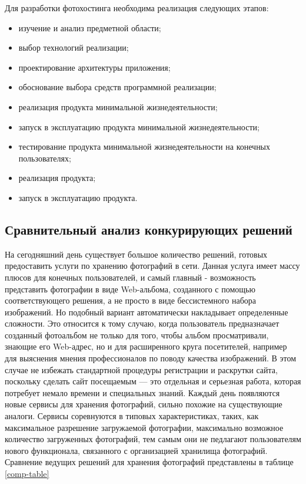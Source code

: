 Для разработки фотохостинга необходима реализация следующих этапов:
\begin{itemize}
    \item изучение и анализ предметной области;
    \item выбор технологий реализации;
    \item проектирование архитектуры приложения;
    \item обоснование выбора средств программной реализации;
    \item реализация продукта минимальной жизнедеятельности;
    \item запуск в эксплуатацию продукта минимальной жизнедеятельности;
    \item тестирование продукта минимальной жизнедеятельности на конечных пользователях;
    \item реализация продукта;
    \item запуск в эксплуатацию продукта.
\end{itemize}

\subsection{Сравнительный анализ конкурирующих решений} \label{comparsion}

На сегодняшний день существует большое количество решений, готовых предоставить услуги по хранению фотографий в сети.
Данная услуга имеет массу плюсов для конечных пользователей, и самый главный  - возможность представить фотографии в виде Web-альбома, созданного с помощью соответствующего решения, а не просто в виде бессистемного набора изображений.
Но подобный вариант автоматически накладывает определенные сложности. 
Это относится к тому случаю, когда пользователь предназначает созданный фотоальбом не только для того, чтобы альбом просматривали, знающие его Web-адрес, но и для расширенного круга посетителей, например для выяснения мнения профессионалов по поводу качества изображений.
В этом случае не избежать стандартной процедуры регистрации и раскрутки сайта, поскольку сделать сайт посещаемым — это отдельная и серьезная работа, которая потребует немало времени и специальных знаний.
Каждый день появляются новые сервисы для хранения фотографий, сильно похожие на существующие аналоги.
Сервисы соревнуются в типовых характеристиках, таких, как максимальное разрешение загружаемой фотографии, максимально возможное количество загруженных фотографий, тем самым они не педлагают пользователям нового функционала, связанного с организацией хранилища фотографий.
Сравнение ведущих решений для хранения фотографий представлены в таблице \ref{comp-table}


